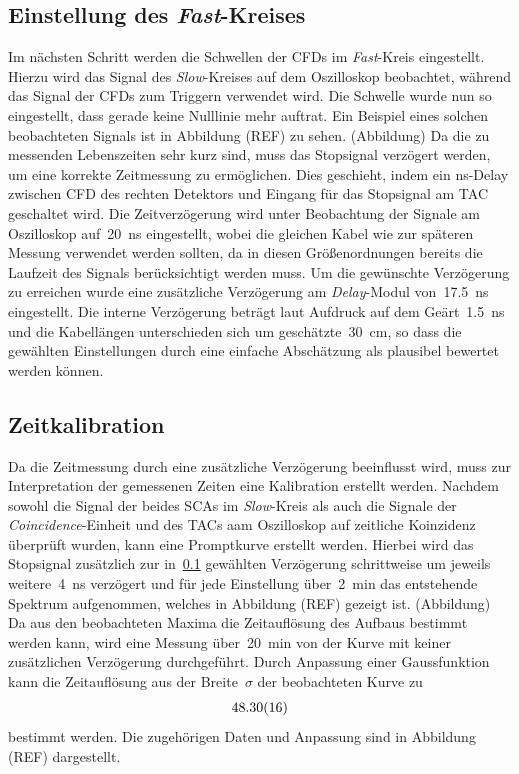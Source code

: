 \documentclass[11pt, a4paper]{article}
\numberwithin{equation}{section}
\newcommand{\korr}[1]{{\color{red}(#1)}}
\begin{document}
\subsection{Einstellung des \textit{Fast}-Kreises}
\label{ssec:fastkreis}
Im nächsten Schritt werden die Schwellen der CFDs im \textit{Fast}-Kreis eingestellt.
Hierzu wird das Signal des \textit{Slow}-Kreises auf dem Oszilloskop beobachtet, während das Signal der CFDs zum Triggern verwendet wird.
Die Schwelle wurde nun so eingestellt, dass gerade keine Nulllinie mehr auftrat.
Ein Beispiel eines solchen beobachteten Signals ist in Abbildung \korr{REF} zu sehen.
\korr{Abbildung}
Da die zu messenden Lebenszeiten sehr kurz sind, muss das Stopsignal verzögert werden, um eine korrekte Zeitmessung zu ermöglichen.
Dies geschieht, indem ein \si{ns}-Delay zwischen CFD des rechten Detektors und Eingang für das Stopsignal am TAC geschaltet wird.
Die Zeitverzögerung wird unter Beobachtung der Signale am Oszilloskop auf~\SI{20}{ns} eingestellt, wobei die gleichen Kabel wie zur späteren Messung verwendet werden sollten, da in diesen Größenordnungen bereits die Laufzeit des Signals berücksichtigt werden muss.
Um die gewünschte Verzögerung zu erreichen wurde eine zusätzliche Verzögerung am \textit{Delay}-Modul von~\SI{17.5}{ns} eingestellt.
Die interne Verzögerung beträgt laut Aufdruck auf dem Geärt~\SI{1.5}{ns} und die Kabellängen unterschieden sich um geschätzte~\SI{30}{cm}, so dass die gewählten Einstellungen durch eine einfache Abschätzung als plausibel bewertet werden können.

\subsection{Zeitkalibration}
Da die Zeitmessung durch eine zusätzliche Verzögerung beeinflusst wird, muss zur Interpretation der gemessenen Zeiten eine Kalibration erstellt werden.
Nachdem sowohl die Signal der beides SCAs im \textit{Slow}-Kreis als auch die Signale der \textit{Coincidence}-Einheit und des TACs aam Oszilloskop auf zeitliche Koinzidenz überprüft wurden, kann eine Promptkurve erstellt werden.
Hierbei wird das Stopsignal zusätzlich zur in~\ref{ssec:fastkreis} gewählten Verzögerung schrittweise um jeweils weitere~\SI{4}{ns} verzögert und für jede Einstellung über~\SI{2}{min} das entstehende Spektrum aufgenommen, welches in Abbildung \korr{REF} gezeigt ist.
\korr{Abbildung}
Da aus den beobachteten Maxima die Zeitauflösung des Aufbaus bestimmt werden kann, wird eine Messung über~\SI{20}{min} von der Kurve mit keiner zusätzlichen Verzögerung durchgeführt.
Durch Anpassung einer Gaussfunktion kann die Zeitauflösung aus der Breite~$\sigma$ der beobachteten Kurve zu 
\begin{align*}
\num{48.30+-0.16}
\end{align*}
bestimmt werden.
Die zugehörigen Daten und Anpassung sind in Abbildung \korr{REF} dargestellt.
\end{document}
